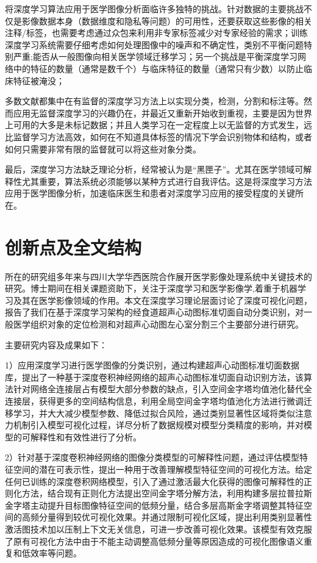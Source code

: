 将深度学习算法应用于医学图像分析面临许多独特的挑战。针对数据的主要挑战不仅是影像数据本身（数据维度和隐私等问题）的可用性，还要获取这些影像的相关注释/标签，也需要考虑通过众包来利用非专家标签减少对专家经验的需求；训练深度学习系统需要仔细考虑如何处理图像中的噪声和不确定性，类别不平衡问题特别严重;能否从一般图像向相关医学领域迁移学习；另一个挑战是平衡深度学习网络中的特征的数量（通常是数千个）与临床特征的数量（通常只有少数）以防止临床特征被淹没； 

多数文献都集中在有监督的深度学习方法上以实现分类，检测，分割和标注等。然而应用无监督深度学习的兴趣仍在，并最近又重新开始收到重视，主要是因为世界上可用的大多是未标记数据；并且人类学习在一定程度上以无监督的方式发生，远比监督学习方法高效，如何在不知道具体标签的情况下学会识别物体和结构，或者如何只需要非常有限的监督就可以将这些对象分类。

最后，深度学习方法缺乏理论分析，经常被认为是“黑匣子”。尤其在医学领域可解释性尤其重要，算法系统必须能够以某种方式进行自我评估。这是将深度学习方法应用于医学图像分析，加速临床医生和患者对深度学习应用的接受程度的关键所在。

\section{创新点及全文结构}

所在的研究组多年来与四川大学华西医院合作展开医学影像处理系统中关键技术的研究。博士期间在相关课题资助下，关注于深度学习和医学影像学,着重于机器学习及其在医学影像领域的作用。本文在深度学习理论层面讨论了深度可视化问题，报告了我们在基于深度学习架构的经食道超声心动图标准切面自动分类识别，对一般医学组织对象的定位检测和对超声心动图左心室分割三个主要部分进行研究。

主要研究内容及成果如下：

1）应用深度学习进行医学图像的分类识别，通过构建超声心动图标准切面数据库，提出了一种基于深度卷积神经网络的超声心动图标准切面自动识别方法，该算法针对网络全连接层占有模型大部分参数的缺点，引入空间金字塔均值池化替代全连接层，获得更多的空间结构信息，利用全局空间金字塔均值池化方法进行微调迁移学习，并大大减少模型参数、降低过拟合风险，通过类别显著性区域将类似注意力机制引入模型可视化过程，详尽分析了数据规模对模型分类精度的影响，并对模型的可解释性和有效性进行了分析。

2）针对基于深度卷积神经网络的图像分类模型的可解释性问题，通过评估模型特征空间的潜在可表示性，提出一种用于改善理解模型特征空间的可视化方法。给定任何已训练的深度卷积网络模型，引入了通过激活最大化获得的图像可解释性的正则化方法，结合现有正则化方法提出空间金字塔分解方法，利用构建多层拉普拉斯金字塔主动提升目标图像特征空间的低频分量，结合多层高斯金字塔调整其特征空间的高频分量得到较优可视化效果。并通过限制可视化区域，提出利用类别显著性激活图技术加以压制上下文无关信息，可进一步改善可视化效果。该模型有效克服了原有可视化方法中由于不能主动调整高低频分量等原因造成的可视化图像语义重复和低效率等问题。

